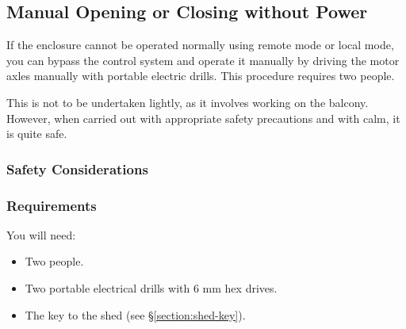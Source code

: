 %
%
%
%
%
%
%

\subsection{Manual Opening or Closing without Power}
\label{section:enclosure-manual-opening-or-closing-without-power}

If the enclosure cannot be operated normally using remote mode or local mode, you can bypass the control system and operate it manually by driving the motor axles manually with portable electric drills. This procedure requires two people. 


This is not to be undertaken lightly, as it involves working on the balcony. However, when carried out with appropriate safety precautions and with calm, it is quite safe.

\subsubsection{Safety Considerations}



\subsubsection{Requirements}

You will need:

\begin{itemize}
\item Two people.
\item Two portable electrical drills with 6 mm hex drives.
\item The key to the shed (see \S\ref{section:shed-key}).
\end{itemize}

